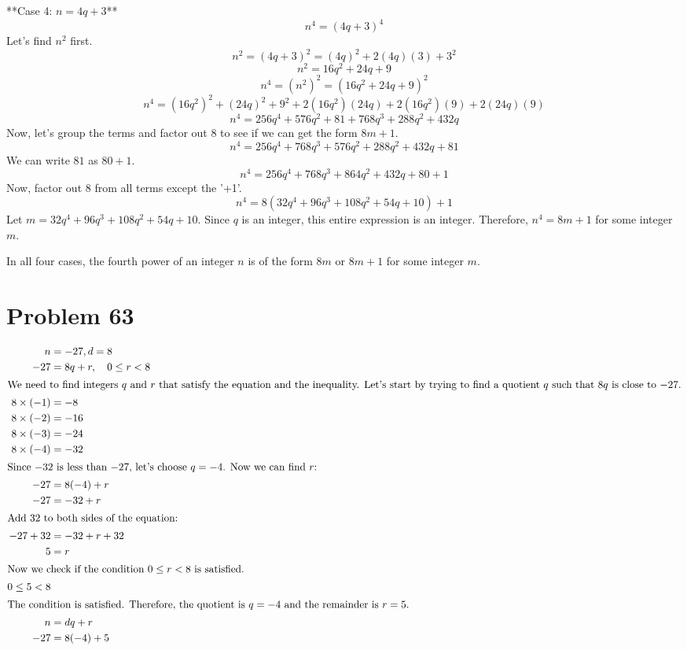 \documentclass{article}
\begin{document}
**Case 4: $n = 4q + 3$**
$$ n^4 = (4q + 3)^4 $$
Let's find $n^2$ first.
$$ n^2 = (4q + 3)^2 = (4q)^2 + 2(4q)(3) + 3^2 $$
$$ n^2 = 16q^2 + 24q + 9 $$
$$ n^4 = (n^2)^2 = (16q^2 + 24q + 9)^2 $$
$$ n^4 = (16q^2)^2 + (24q)^2 + 9^2 + 2(16q^2)(24q) + 2(16q^2)(9) + 2(24q)(9) $$
$$ n^4 = 256q^4 + 576q^2 + 81 + 768q^3 + 288q^2 + 432q $$
Now, let's group the terms and factor out 8 to see if we can get the form $8m + 1$.
$$ n^4 = 256q^4 + 768q^3 + 576q^2 + 288q^2 + 432q + 81 $$
We can write $81$ as $80 + 1$.
$$ n^4 = 256q^4 + 768q^3 + 864q^2 + 432q + 80 + 1 $$
Now, factor out 8 from all terms except the '+1'.
$$ n^4 = 8(32q^4 + 96q^3 + 108q^2 + 54q + 10) + 1 $$
Let $m = 32q^4 + 96q^3 + 108q^2 + 54q + 10$. Since $q$ is an integer, this entire expression is an integer.
Therefore, $n^4 = 8m + 1$ for some integer $m$.

In all four cases, the fourth power of an integer $n$ is of the form $8m$ or $8m + 1$ for some integer $m$.

\newpage

\section*{Problem 63}
\begin{align*}
n &= -27, d = 8 \\
-27 &= 8q + r, \quad 0 \le r < 8 \\
\intertext{We need to find integers $q$ and $r$ that satisfy the equation and the inequality. Let's start by trying to find a quotient $q$ such that $8q$ is close to $-27$.}
8 \times (-1) &= -8 \\
8 \times (-2) &= -16 \\
8 \times (-3) &= -24 \\
8 \times (-4) &= -32 \\
\intertext{Since $-32$ is less than $-27$, let's choose $q = -4$. Now we can find $r$:}
-27 &= 8(-4) + r \\
-27 &= -32 + r \\
\intertext{Add 32 to both sides of the equation:}
-27 + 32 &= -32 + r + 32 \\
5 &= r \\
\intertext{Now we check if the condition $0 \le r < 8$ is satisfied.}
0 \le 5 < 8 \\
\intertext{The condition is satisfied. Therefore, the quotient is $q = -4$ and the remainder is $r = 5$.}
n &= dq + r \\
-27 &= 8(-4) + 5 \\
\end{align*}
\end{document}

